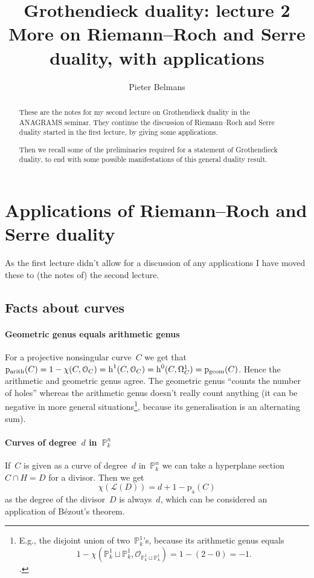 \documentclass[10pt,a4paper]{article}
\title{Grothendieck duality: lecture 2 \\[.2em] \Large More on Riemann--Roch and Serre duality, with applications}
\author{Pieter Belmans}
\begin{document}
\maketitle

\begin{abstract}
  These are the notes for my second lecture on Grothendieck duality in the ANAGRAMS seminar. They continue the discussion of Riemann--Roch and Serre duality started in the first lecture, by giving some applications.

  Then we recall some of the preliminaries required for a statement of Grothendieck duality, to end with some possible manifestations of this general duality result.
\end{abstract}

\tableofcontents

\clearpage


\section{Applications of Riemann--Roch and Serre duality}
\label{section:applications-riemann-roch}
As the first lecture didn't allow for a discussion of any applications I have moved these to (the notes of) the second lecture.

\subsection{Facts about curves}
\label{subsection:facts-curves}
\paragraph{Geometric genus equals arithmetic genus}
For a projective nonsingular curve~$C$ we get that~$\mathrm{p}_{\mathrm{arith}}(C)=1-\chi(C,\mathcal{O}_C)=\operatorname{h}^1(C,\mathcal{O}_C)=\operatorname{h}^0(C,\Omega_C^1)=\mathrm{p}_{\mathrm{geom}}(C)$. Hence the arithmetic and geometric genus agree. The geometric genus ``counts the number of holes'' whereas the arithmetic genus doesn't really count anything (it can be negative in more general situations\footnote{E.g., the disjoint union of two~$\mathbb{P}_k^1$'s, because its arithmetic genus equals\begin{equation}1-\chi(\mathbb{P}_k^1\sqcup\mathbb{P}_k^1,\mathcal{O}_{\mathbb{P}_k^1\sqcup\mathbb{P}_k^1})=1-(2-0)=-1.\end{equation}.}, because its generalisation is an alternating sum).

\paragraph{Curves of degree~$d$ in~$\mathbb{P}_k^n$}
If~$C$ is given as a curve of degree~$d$ in~$\mathbb{P}_k^n$ we can take a hyperplane section~$C\cap H=D$ for a divisor. Then we get
\begin{equation}
  \chi(\mathcal{L}(D))=d+1-\mathrm{p}_{\mathrm{a}}(C)
\end{equation}
as the degree of the divisor~$D$ is always~$d$, which can be considered an application of B\'ezout's theorem.
\end{document}
